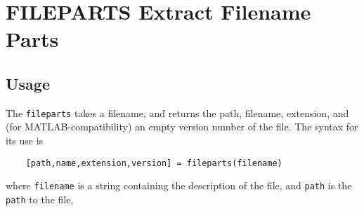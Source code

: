 \section{FILEPARTS Extract Filename Parts}

\subsection{Usage}

The \verb|fileparts| takes a filename, and returns the path, filename, extension, and
(for MATLAB-compatibility) an empty version number of the file.  The syntax for its use is
\begin{verbatim}
    [path,name,extension,version] = fileparts(filename)
\end{verbatim}
where \verb|filename| is a string containing the description of the file, and \verb|path|
is the \verb|path| to the file, 
